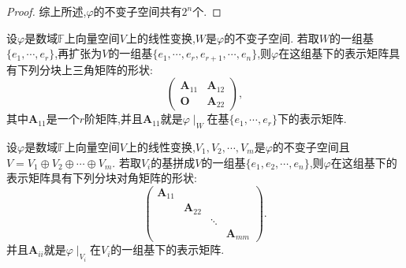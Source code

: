 \documentclass[../../main.tex]{subfiles}%
\begin{document}
\begin{proof}
综上所述,\(\varphi\)的不变子空间共有\(2^n\)个. 

\end{proof}

\begin{theorem}\label{theorem:在不变子空间基下的矩阵}
设\(\varphi\)是数域\(\mathbb{F}\)上向量空间\(V\)上的线性变换,\(W\)是\(\varphi\)的不变子空间. 若取\(W\)的一组基\(\{e_1,\cdots,e_r\}\),再扩张为\(V\)的一组基\(\{e_1,\cdots,e_r,e_{r + 1},\cdots,e_n\}\),则\(\varphi\)在这组基下的表示矩阵具有下列分块上三角矩阵的形状:
\[
\begin{pmatrix}
\boldsymbol{A}_{11}&\boldsymbol{A}_{12}\\
\boldsymbol{O}&\boldsymbol{A}_{22}
\end{pmatrix},
\]
其中\(\boldsymbol{A}_{11}\)是一个\(r\)阶矩阵,并且$\boldsymbol{A}_{11}$就是$\varphi\mid _W$在基$\{e_1,\cdots,e_r\}$下的表示矩阵.
\end{theorem}

\begin{theorem}\label{theorem:在直和的基下的矩阵}
设\(\varphi\)是数域\(\mathbb{F}\)上向量空间\(V\)上的线性变换,\(V_1,V_2,\cdots,V_m\)是\(\varphi\)的不变子空间且\(V = V_1\oplus V_2\oplus\cdots\oplus V_m\). 若取\(V_i\)的基拼成\(V\)的一组基\(\{e_1,e_2,\cdots,e_n\}\),则\(\varphi\)在这组基下的表示矩阵具有下列分块对角矩阵的形状:
\[
\begin{pmatrix}
\boldsymbol{A}_{11}&&&\\
&\boldsymbol{A}_{22}&&\\
&&\ddots&\\
&&&\boldsymbol{A}_{mm}
\end{pmatrix}.
\]
并且$\boldsymbol{A}_{ii}$就是$\varphi\mid_{V_i}$在$V_i$的一组基下的表示矩阵.
\end{theorem}
\end{document}
